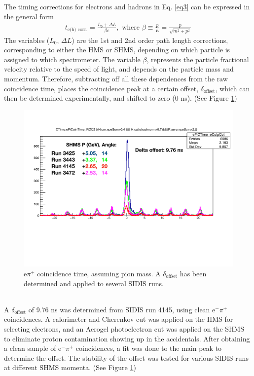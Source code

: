 \documentclass[14pt]{article}
\begin{document}
  \noindent The timing corrections for electrons and hadrons in Eq. \ref{eq3} can be expressed in the general form
  \begin{equation}
    \begin{aligned}
      t_{\text{e(h) corr.}} = \frac{L_{0} + \Delta L}{\beta c}, \text{  where } \beta \equiv \frac{p}{E} = \frac{p}{\sqrt{m^{2} + p^{2}}}
    \end{aligned}
  \end{equation}
  The variables ($L_{0}$, $\Delta L$) are the 1st and 2nd order path length corrections, corresponding to either the HMS or SHMS, depending on which particle
  is assigned to which spectrometer. The variable $\beta$, represents
  the particle fractional velocity relative to the speed of light, and depends on the particle mass and momentum. Therefore, subtracting off all these
  dependences from the raw coincidence time, places the coincidence peak at a certain offset, $\delta_{\text{offset}}$, which can then be determined experimentally, and
  shifted to zero (0 ns). (See Figure \ref{fig:eH_offset})
  \begin{figure}[h]
  \includegraphics[scale=0.5]{ePi_compare.pdf}
  \caption{e$\pi^{+}$ coincidence time, assuming pion mass. A $\delta_{\text{offset}}$ has been determined and applied to several SIDIS runs.}
  \label{fig:eH_offset}
  \end{figure}
  \\
  \noindent A $\delta_{\text{offset}}$ of 9.76 ns was determined from SIDIS run 4145, using clean e$^{-}\pi^{+}$ coincidences. A calorimeter and Cherenkov cut was
  applied on the HMS for selecting electrons, and an Aerogel photoelectron cut was applied on the SHMS
  to eliminate proton contamination showing up in the accidentals. After obtaining a clean sample of e$^{-}\pi^{+}$ coincidences, a fit was done to the main peak to
  determine the offset. The stability of the offset was tested for various SIDIS runs at different SHMS momenta. (See Figure \ref{fig:eH_offset})
\end{document}
